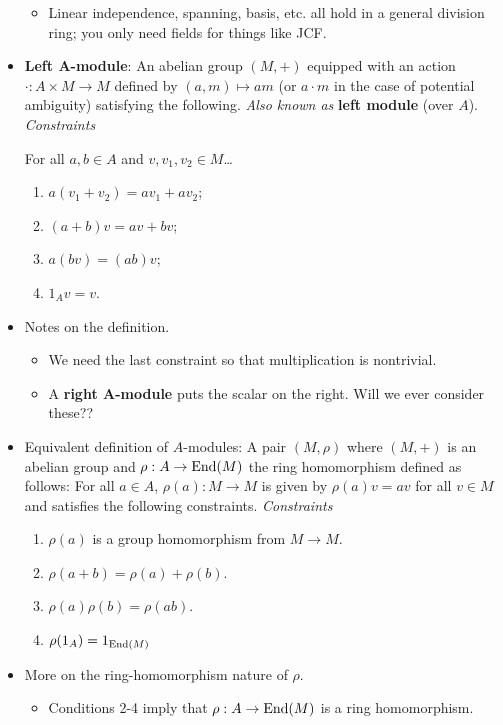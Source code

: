 \documentclass[../notes.tex]{subfiles}
\begin{document}
\begin{itemize}
\begin{itemize}
        \item Linear independence, spanning, basis, etc. all hold in a general division ring; you only need fields for things like JCF.
    \end{itemize}
    \item \textbf{Left $\bm{A}$-module}: An abelian group $(M,+)$ equipped with an action $\cdot:A\times M\to M$ defined by $(a,m)\mapsto am$ (or $a\cdot m$ in the case of potential ambiguity) satisfying the following. \emph{Also known as} \textbf{left module} (over $A$). \emph{Constraints}\par
    For all $a,b\in A$ and $v,v_1,v_2\in M$\dots
    \begin{enumerate}[label={(\arabic*)}]
        \item $a(v_1+v_2)=av_1+av_2$;
        \item $(a+b)v=av+bv$;
        \item $a(bv)=(ab)v$;
        \item $1_Av=v$.
    \end{enumerate}
    \item Notes on the definition.
    \begin{itemize}
        \item We need the last constraint so that multiplication is nontrivial.
        \item A \textbf{right $\bm{A}$-module} puts the scalar on the right. Will we ever consider these??
    \end{itemize}
    \item Equivalent definition of $A$-modules: A pair $(M,\rho)$ where $(M,+)$ is an abelian group and $\rho:A\to\operatorname{End}(M)$ the ring homomorphism defined as follows: For all $a\in A$, $\rho(a):M\to M$ is given by $\rho(a)v=av$ for all $v\in M$ and satisfies the following constraints. \emph{Constraints}
    \begin{enumerate}[label={(\arabic*)}]
        \item $\rho(a)$ is a group homomorphism from $M\to M$.
        \item $\rho(a+b)=\rho(a)+\rho(b)$.
        \item $\rho(a)\rho(b)=\rho(ab)$.
        \item $\rho(1_A)=1_{\operatorname{End}(M)}$
    \end{enumerate}
    \item More on the ring-homomorphism nature of $\rho$.
    \begin{itemize}
        \item Conditions 2-4 imply that $\rho:A\to\operatorname{End}(M)$ is a ring homomorphism.

\end{itemize}
\end{itemize}
\end{document}
